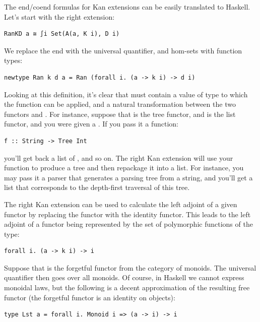The end/coend formulas for Kan extensions can be easily translated to
Haskell. Let's start with the right extension:

\begin{verbatim}
RanKD a ≅ ∫i Set(A(a, K i), D i)
\end{verbatim}

We replace the end with the universal quantifier, and hom-sets with
function types:

\begin{verbatim}
newtype Ran k d a = Ran (forall i. (a -> k i) -> d i)
\end{verbatim}

Looking at this definition, it's clear that  must contain a
value of type  to which the function can be applied, and a
natural transformation between the two functors  and
. For instance, suppose that  is the tree functor,
and  is the list functor, and you were given a
. If you pass it a function:

\begin{verbatim}
f :: String -> Tree Int
\end{verbatim}

you'll get back a list of , and so on. The right Kan
extension will use your function to produce a tree and then repackage it
into a list. For instance, you may pass it a parser that generates a
parsing tree from a string, and you'll get a list that corresponds to
the depth-first traversal of this tree.

The right Kan extension can be used to calculate the left adjoint of a
given functor by replacing the functor  with the identity
functor. This leads to the left adjoint of a functor  being
represented by the set of polymorphic functions of the type:

\begin{verbatim}
forall i. (a -> k i) -> i
\end{verbatim}

Suppose that  is the forgetful functor from the category of
monoids. The universal quantifier then goes over all monoids. Of course,
in Haskell we cannot express monoidal laws, but the following is a
decent approximation of the resulting free functor (the forgetful
functor  is an identity on objects):

\begin{verbatim}
type Lst a = forall i. Monoid i => (a -> i) -> i
\end{verbatim}

